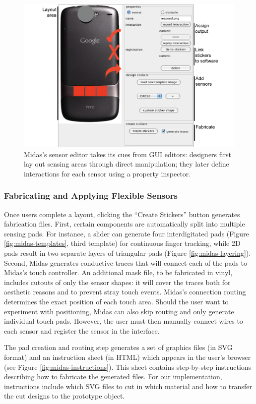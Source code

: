 \begin{figure}[b!]
\centering
\includegraphics[width=\textwidth]{figures/midas/ui.png}
\caption{Midas's sensor editor takes its cues from GUI editors: designers first lay out sensing areas through direct manipulation; they later define interactions for each sensor using a property inspector.} 
\label{fig:midas-editor}
\end{figure}


        \subsubsection{Fabricating and Applying Flexible Sensors}
Once users complete a layout, clicking the ``Create Stickers''
button generates fabrication files. First, certain components
are automatically split into multiple sensing pads. For instance,
a slider can generate four interdigitated pads (Figure \ref{fig:midas-templates}, third template) for continuous finger tracking, while
2D pads result in two separate layers of triangular pads (Figure
\ref{fig:midas-layering}). Second, Midas generates conductive traces that will
connect each of the pads to Midas's touch controller. An additional mask file, to be fabricated in vinyl, includes cutouts
of only the sensor shapes: it will cover the traces both for aesthetic
reasons and to prevent stray touch events. Midas's connection
routing determines the exact position of each touch
area. Should the user want to experiment with positioning,
Midas can also skip routing and only generate individual
touch pads. However, the user must then manually connect
wires to each sensor and register the sensor in the interface.

The pad creation and routing step generates a set of graphics
files (in SVG format) and an instruction sheet (in HTML)
which appears in the user's browser (see Figure \ref{fig:midas-instructions}). This sheet
contains step-by-step instructions describing how to fabricate
the generated files. For our implementation, instructions include
which SVG files to cut in which material and how to
transfer the cut designs to the prototype object.

